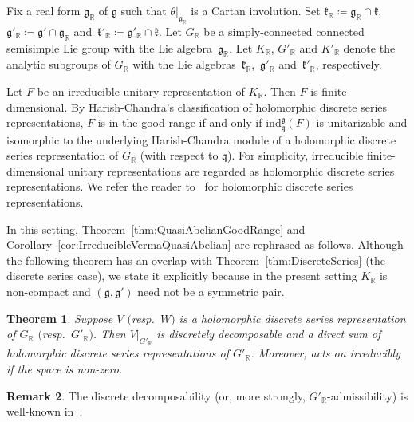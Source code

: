 \documentclass[10pt,a4paper]{amsart}
\numberwithin{equation}{section}
\newtheorem{Theorem}{Theorem}[section]
\theoremstyle{definition}
\newtheorem{Remark}[Theorem]{Remark}
\newcommand{\Hom}{\mathrm{Hom}}
\newcommand{\BasicRing}[1]{\mathbb{#1}}
\newcommand{\RR}{\BasicRing{R}}
\newcommand{\lieC}[1]{\mathfrak{#1}}
\newcommand{\lie}[1]{\mathfrak{#1}}
\newcommand{\univ}[1]{\mathcal{U}(\lieC{#1})}
\newcommand{\ind}[2]{\mathrm{ind}^{\lieC{#1}}_{\lieC{#2}}}
\begin{document}
Fix a real form $\lie{g}_\RR$ of $\lie{g}$ such that $\theta|_{\lie{g}_\RR}$ is a Cartan involution.
Set $\lie{k}_\RR\coloneq \lie{g}_\RR \cap \lie{k}$, $\lie{g}'_\RR\coloneq \lie{g}'\cap \lie{g}_\RR$ and~${\lie{k}'_\RR\coloneq \lie{g}'_\RR \cap \lie{k}}$.
Let $G_\RR$ be a simply-connected connected semisimple Lie group with the Lie algebra~$\lie{g}_\RR$.
Let $K_\RR$, $G'_\RR$ and $K'_\RR$ denote the analytic subgroups of $G_\RR$ with the Lie algebras~$\lie{k}_\RR$,~$\lie{g}'_\RR$ and~$\lie{k}'_\RR$, respectively.

Let $F$ be an irreducible unitary representation of $K_\RR$.
Then $F$ is finite-dimensional.
By Harish-Chandra's classification of holomorphic discrete series representations, $F$ is in the good range if and only if
$\ind{g}{q}(F)$ is unitarizable and isomorphic to the underlying Harish-Chandra module of a holomorphic discrete series representation of $G_\RR$ (with respect to $\lie{q}$).
For simplicity, irreducible finite-dimensional unitary representations are regarded as holomorphic discrete series representations.
We refer the reader to~\cite[Chapter~VI]{Kn86} for holomorphic discrete series representations.

In this setting, Theorem~\ref{thm:QuasiAbelianGoodRange} and Corollary~\ref{cor:IrreducibleVermaQuasiAbelian} are rephrased as follows.
Although the following theorem has an overlap with Theorem~\ref{thm:DiscreteSeries} (the discrete series case),
we state it explicitly because in the present setting $K_\RR$ is non-compact and $(\lie{g}, \lie{g'})$ need not be a symmetric pair.

\begin{Theorem}\label{thm:IrreducibleHolomorphicDisc}
	Suppose $V$ $($resp.\ $W)$ is a holomorphic discrete series representation of $G_\RR$ $($resp.~$G'_\RR)$.
	Then $V|_{G'_\RR}$ is discretely decomposable and a direct sum of holomorphic discrete series representations of $G'_\RR$.
	Moreover, \smash{$\univ{g}^{G'}$} acts on \smash{$\Hom_{G'_\RR}\bigl(W, V|_{G'_\RR}\bigr)$} irreducibly if the space is non-zero.
\end{Theorem}

\begin{Remark}
	The discrete decomposability (or, more strongly, $G'_\RR$-admissibility) is well-known in~\cite[Theorem~7.4]{Ko98}.
\end{Remark}
\end{document}
